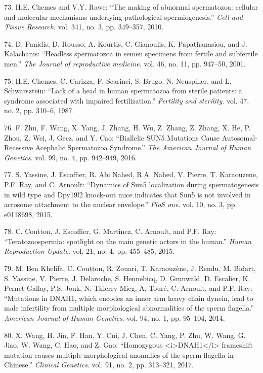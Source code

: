 \documentclass[12pt,twoside]{ugathesis}
\theoremstyle{definition}
\theoremstyle{definition}
\theoremstyle{remark}
\begin{document}
\hypertarget{ref-Chemes2010}{}
73. H.E. Chemes and V.Y. Rawe: ``The making of abnormal spermatozoa:
cellular and molecular mechanisms underlying pathological
spermiogenesis.'' \emph{Cell and Tissue Research}. vol. 341, no. 3, pp.
349--357, 2010.

\hypertarget{ref-Panidis2001}{}
74. D. Panidis, D. Rousso, A. Kourtis, C. Gianoulis, K. Papathanasiou,
and J. Kalachanis: ``Headless spermatozoa in semen specimens from
fertile and subfertile men.'' \emph{The Journal of reproductive
medicine}. vol. 46, no. 11, pp. 947--50, 2001.

\hypertarget{ref-Chemes1987}{}
75. H.E. Chemes, C. Carizza, F. Scarinci, S. Brugo, N. Neuspiller, and
L. Schwarsztein: ``Lack of a head in human spermatozoa from sterile
patients: a syndrome associated with impaired fertilization.''
\emph{Fertility and sterility}. vol. 47, no. 2, pp. 310--6, 1987.

\hypertarget{ref-Zhu2016}{}
76. F. Zhu, F. Wang, X. Yang, J. Zhang, H. Wu, Z. Zhang, Z. Zhang, X.
He, P. Zhou, Z. Wei, J. Gecz, and Y. Cao: ``Biallelic SUN5 Mutations
Cause Autosomal-Recessive Acephalic Spermatozoa Syndrome.'' \emph{The
American Journal of Human Genetics}. vol. 99, no. 4, pp. 942--949, 2016.

\hypertarget{ref-Yassine2015}{}
77. S. Yassine, J. Escoffier, R. Abi Nahed, R.A. Nahed, V. Pierre, T.
Karaouzene, P.F. Ray, and C. Arnoult: ``Dynamics of Sun5 localization
during spermatogenesis in wild type and Dpy19l2 knock-out mice indicates
that Sun5 is not involved in acrosome attachment to the nuclear
envelope.'' \emph{PloS one}. vol. 10, no. 3, pp. e0118698, 2015.

\hypertarget{ref-Coutton2015}{}
78. C. Coutton, J. Escoffier, G. Martinez, C. Arnoult, and P.F. Ray:
``Teratozoospermia: spotlight on the main genetic actors in the human.''
\emph{Human Reproduction Update}. vol. 21, no. 4, pp. 455--485, 2015.

\hypertarget{ref-BenKhelifa2014}{}
79. M. Ben Khelifa, C. Coutton, R. Zouari, T. Karaouzène, J. Rendu, M.
Bidart, S. Yassine, V. Pierre, J. Delaroche, S. Hennebicq, D. Grunwald,
D. Escalier, K. Pernet-Gallay, P.S. Jouk, N. Thierry-Mieg, A. Touré, C.
Arnoult, and P.F. Ray: ``Mutations in DNAH1, which encodes an inner arm
heavy chain dynein, lead to male infertility from multiple morphological
abnormalities of the sperm flagella.'' \emph{American Journal of Human
Genetics}. vol. 94, no. 1, pp. 95--104, 2014.

\hypertarget{ref-Wang2017}{}
80. X. Wang, H. Jin, F. Han, Y. Cui, J. Chen, C. Yang, P. Zhu, W. Wang,
G. Jiao, W. Wang, C. Hao, and Z. Gao: ``Homozygous
\textless{}i\textgreater{}DNAH1\textless{}/i\textgreater{} frameshift
mutation causes multiple morphological anomalies of the sperm flagella
in Chinese.'' \emph{Clinical Genetics}. vol. 91, no. 2, pp. 313--321,
2017.
\end{document}
